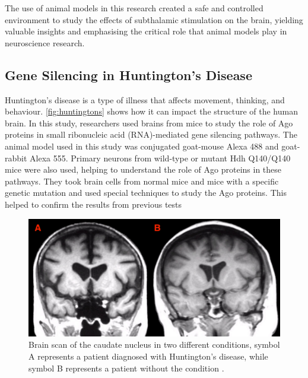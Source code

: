 \documentclass[10pt]{article}
\begin{document}
\begin{sloppypar}
  The use of animal models in this research created a safe and controlled environment to study the effects of subthalamic stimulation on the brain, yielding valuable insights and emphasising the critical role that animal models play in neuroscience research.

  \subsection{Gene Silencing in Huntington’s Disease}
  \label{sec:huntingtons}

  Huntington’s disease is a type of illness that affects movement, thinking, and behaviour. \autoref{fig:huntingtons} shows how it can impact the structure of the human brain. In this study, researchers used brains from mice to study the role of Ago proteins in small ribonucleic acid (RNA)-mediated gene silencing pathways. The animal model used in this study was conjugated goat-mouse Alexa 488 and goat-rabbit Alexa 555. Primary neurons from wild-type or mutant Hdh Q140/Q140 mice were also used, helping to understand the role of Ago proteins in these pathways. They took brain cells from normal mice and mice with a specific genetic mutation and used special techniques to study the Ago proteins. This helped to confirm the results from previous tests

  \vspace{10pt} %
  \begin{figure}[ht]
    \centering
    \includegraphics[width=\textwidth]{figures/huntington.jpg}
    \caption[Brain scan of the caudate nucleus in two different conditions, symbol A represents a patient diagnosed with Huntington’s disease, while symbol B represents a patient without the condition]{Brain scan of the caudate nucleus in two different conditions, symbol A represents a patient diagnosed with Huntington’s disease, while symbol B represents a patient without the condition \citep{c_preston_huntingtons_nodate}.}
    \label{fig:huntingtons}
  \end{figure}


\end{sloppypar}
\end{document}
